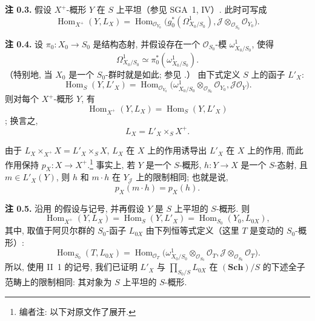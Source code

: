 
\setcounter{footnote}{20}

\medskip
\noindent{}\textbf{注 0.3.}
假设 \(X^+\)-概形 \(Y\) 在 \(S\) 上平坦（参见 SGA~1,
IV）. 此时可写成
\[
 \operatorname{Hom}_{X^+}(Y,L_X)
 =
 \operatorname{Hom}_{\mathscr O_{Y_0}}
 \bigl(g_0^*(\Omega^1_{X_0/S_0}),
       \mathscr J\otimes_{\mathscr O_{S_0}}\mathscr O_{Y_0}\bigr).
\]

\medskip
\noindent{}\textbf{注 0.4.}
设 \(\pi_0:X_0\to S_0\) 是结构态射, 并假设存在一个
\(\mathscr O_{S_0}\)-模 \(\omega^1_{X_0/S_0}\), 使得
\[
 \Omega^1_{X_0/S_0}\simeq
 \pi_0^*(\omega^1_{X_0/S_0}).
\]
（特别地, 当 \(X_0\) 是一个 \(S_0\)-群时就是如此;
参见 .）
由下式定义 \(S\) 上的函子 \(L'_X\):
\begin{equation}
 \operatorname{Hom}_S(Y,L'_X)
 =
 \operatorname{Hom}_{\mathscr O_{Y_0}}
 \bigl(\omega^1_{X_0/S_0}\otimes_{\mathscr O_{S_0}}\mathscr O_{Y_0},
       \mathscr J\mathscr O_Y\bigr).
 \tag{0.4.1}\label{sga3:iii:remark:0-4:equation:0-4-1}
\end{equation}
则对每个 \(X^+\)-概形 \(Y\), 有
\[
 \operatorname{Hom}_{X^+}(Y,L_X)=\operatorname{Hom}_S(Y,L'_X)
\]
; 换言之,
\[
 L_X=L'_X\mathbin{\times_S}X^+.
\]

由于
\(L_X\mathbin{\times_{X^+}}X=L'_X\mathbin{\times_S}X\),
\(L_X\) 在 \(X\) 上的作用诱导出 \(L'_X\) 在 \(X\) 上的作用,
而此作用保持 \(p_X:X\to X^+\).\footnote{编者注: 以下对原文作了展开.}
事实上, 若 \(Y\) 是一个 \(S\)-概形,
\(h:Y\to X\) 是一个 \(S\)-态射, 且 \(m\in L'_X(Y)\),
则 \(h\) 和 \(m\cdot h\) 在 \(Y_{\mathscr J}\) 上的限制相同;
也就是说,
\[
 p_X(m\cdot h)=p_X(h).
\]

\medskip
\noindent{}\textbf{注 0.5.}
沿用  的假设与记号,
并再假设 \(Y\) 是 \(S\) 上平坦的 \(S\)-概形. 则
\[
 \operatorname{Hom}_{X^+}(Y,L_X)
 =\operatorname{Hom}_S(Y,L'_X)
 =\operatorname{Hom}_{S_0}(Y_0,L_{0X}),
\]
其中, 取值于阿贝尔群的 \(S_0\)-函子 \(L_{0X}\)
由下列恒等式定义（这里 \(T\) 是变动的 \(S_0\)-概形）:
\begin{equation}
 \operatorname{Hom}_{S_0}(T,L_{0X})
 =
 \operatorname{Hom}_{\mathscr O_T}
 \bigl(\omega^1_{X_0/S_0}\otimes_{\mathscr O_{S_0}}\mathscr O_T,
       \mathscr J\otimes_{\mathscr O_{S_0}}\mathscr O_T\bigr).
 \tag{0.5.1}\label{sga3:iii:remark:0-5:equation:0-5-1}
\end{equation}
所以, 使用 II~1 的记号, 我们已证明 \(L'_X\) 与
\(\prod_{S_0/S}L_{0X}\) 在 \((\mathbf{Sch})/S\) 的下述全子范畴上的限制相同:
其对象为 \(S\) 上平坦的 \(S\)-概形.

